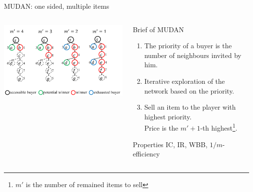 \documentclass{beamer}
\begin{document}
\begin{frame}{MUDAN: one sided, multiple items}
	\begin{columns}
		\begin{column}{0.3\textwidth}
			\begin{center}
				\includegraphics[width=\textwidth]{MUDAN-example}
			\end{center}
		\end{column}
		\begin{column}{0.7\textwidth}
			\begin{block}{Brief of MUDAN}
				\begin{enumerate}
					\item The priority of a buyer is the number of neighbours invited by him.
					\item Iterative exploration of the network based on the priority.
					\item Sell an item to the player with highest priority.\\
					      Price is the $m'+1$-th highest\footnote{$m'$ is the number of remained items to sell}.
				\end{enumerate}
			\end{block}
			\begin{block}{Properties}
				IC, IR, WBB, $1/m$-efficiency
			\end{block}
		\end{column}
	\end{columns}
\end{frame}
\end{document}
